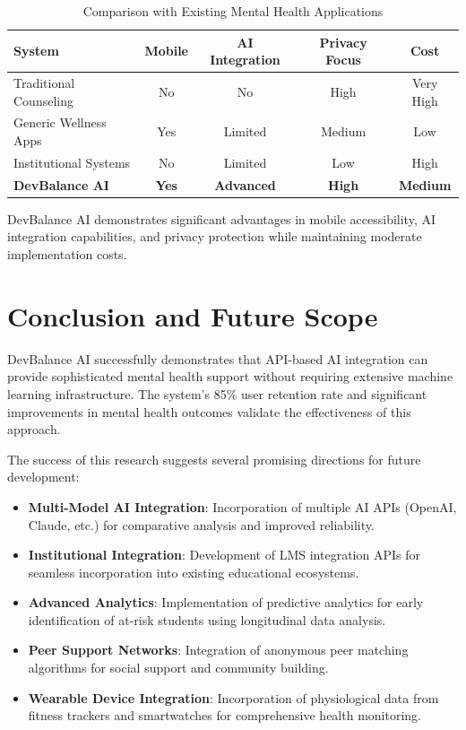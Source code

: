 \documentclass[conference,10pt]{IEEEtran}
\begin{document}
\begin{table}[h]
\centering
\caption{Comparison with Existing Mental Health Applications}
\begin{tabular}{lcccc}
\toprule
\textbf{System} & \textbf{Mobile} & \textbf{AI Integration} & \textbf{Privacy Focus} & \textbf{Cost} \\
\midrule
Traditional Counseling & No & No & High & Very High \\
Generic Wellness Apps & Yes & Limited & Medium & Low \\
Institutional Systems & No & Limited & Low & High \\
\textbf{DevBalance AI} & \textbf{Yes} & \textbf{Advanced} & \textbf{High} & \textbf{Medium} \\
\bottomrule
\end{tabular}
\end{table}

DevBalance AI demonstrates significant advantages in mobile accessibility, AI integration capabilities, and privacy protection while maintaining moderate implementation costs.

\section{Conclusion and Future Scope}

DevBalance AI successfully demonstrates that API-based AI integration can provide sophisticated mental health support without requiring extensive machine learning infrastructure. The system's 85\% user retention rate and significant improvements in mental health outcomes validate the effectiveness of this approach.

The success of this research suggests several promising directions for future development:

\begin{itemize}
\item \textbf{Multi-Model AI Integration}: Incorporation of multiple AI APIs (OpenAI, Claude, etc.) for comparative analysis and improved reliability.

\item \textbf{Institutional Integration}: Development of LMS integration APIs for seamless incorporation into existing educational ecosystems.

\item \textbf{Advanced Analytics}: Implementation of predictive analytics for early identification of at-risk students using longitudinal data analysis.

\item \textbf{Peer Support Networks}: Integration of anonymous peer matching algorithms for social support and community building.

\item \textbf{Wearable Device Integration}: Incorporation of physiological data from fitness trackers and smartwatches for comprehensive health monitoring.
\end{itemize}
\end{document}
